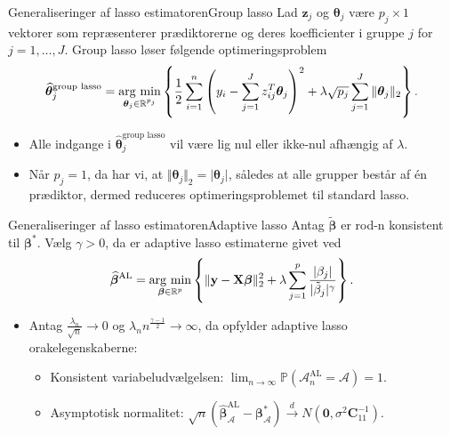 \begin{frame}{Generaliseringer af lasso estimatoren}{Group lasso}
Lad \(\mathbf{z}_j\) og \(\boldsymbol{\theta}_j\) være \(p_j \times 1\) vektorer som repræsenterer prædiktorerne og deres koefficienter i gruppe \(j\) for \(j = 1, \ldots, J\).
Group lasso løser følgende optimeringsproblem
\begin{align*}
\widehat{\boldsymbol{\theta}}_j^{\text{group lasso}} = \argmin_{\boldsymbol{\theta}_j \in \R^{p_j}} \cbr{\frac{1}{2} \sum_{i=1}^n \del{y_i - \sum_{j=1}^J z_{ij}^T \boldsymbol{\theta}_j}^2 + \lambda \sqrt{p_j} \sum_{j=1}^J \Vert \boldsymbol{\theta}_j \Vert_2}.
\end{align*}
\begin{itemize}
\item Alle indgange i $\widehat{\boldsymbol{\theta}}_j^\text{group lasso}$ vil være lig nul eller ikke-nul afhængig af \(\lambda\).
\item Når $p_j=1$, da har vi, at $\Vert \boldsymbol{\theta}_j \Vert_2 = \vert \boldsymbol{\theta}_j \vert$, således at alle grupper består af én prædiktor, dermed reduceres optimeringsproblemet til standard lasso.
\end{itemize}
\end{frame}
%
\begin{frame}{Generaliseringer af lasso estimatoren}{Adaptive lasso}
Antag \(\tilde{\boldsymbol{\beta}}\) er rod-n konsistent til \(\boldsymbol{\beta}^*\). Vælg \(\gamma >0\), da er adaptive lasso estimaterne givet ved
\begin{align*}
\widehat{\boldsymbol{\beta}}^\text{AL} = \argmin_{\boldsymbol{\beta} \in \R^p} \cbr{ \Vert \mathbf{y} - \mathbf{X} \boldsymbol{\beta} \Vert_2^2 + \lambda \sum_{j=1}^p \frac{ \vert \beta_j \vert}{\vert \tilde{\beta}_j \vert^\gamma}}.
\end{align*}
\begin{itemize}
\item Antag $\frac{\lambda_n}{\sqrt{n}} \rightarrow 0$ og $\lambda_n n^\frac{\gamma-1}{2} \rightarrow \infty$, da opfylder adaptive lasso orakelegenskaberne:
\begin{itemize}
\item Konsistent variabeludvælgelsen: $\lim_{n \rightarrow \infty} \mathbb{P}(\mathcal{A}_n^\text{AL}=\mathcal{A})=1$.
\item Asymptotisk normalitet: $\sqrt{n}\left( \widehat{\boldsymbol{\beta}}_\mathcal{A}^{\text{AL}}-\boldsymbol{\beta}_\mathcal{A}^* \right) \overset{d}{\rightarrow} N(\textbf{0},\sigma^2 \boldsymbol{C}_{11}^{-1}).$
\end{itemize} 
\end{itemize} 
\end{frame}

